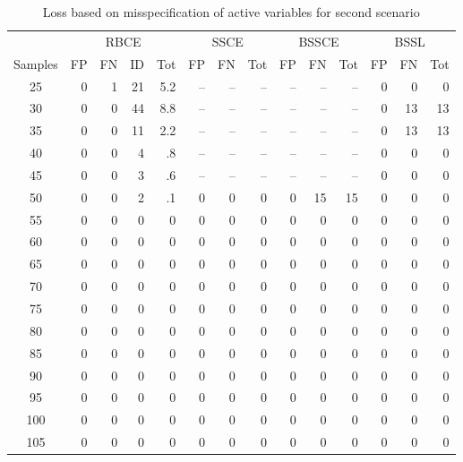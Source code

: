 \documentclass[preprint,12pt]{elsarticle}
\begin{document}
\begin{table}
\small
\caption{Loss based on misspecification of active variables for second scenario}
\label{tab:misspec2}
\begin{tabular}{|c||rrr|r||rr|r||rr|r||rr|r|}
  \hline
  &\multicolumn{4}{c||}{RBCE}&\multicolumn{3}{c||}{SSCE}
  &\multicolumn{3}{c||}{BSSCE}&\multicolumn{3}{c|}{BSSL}\\
  \cline{2-14}
 Samples & FP & FN & ID & Tot & FP & FN & Tot & FP & FN & Tot & FP & FN & Tot \\ 
  \hline
25 &   0 &   1 &  21 & 5.2 & -- &  --  &  -- &  --  &  -- &  --  &   0 &   0 &   0\\ 
  30 &   0 &   0 &  44 & 8.8 & -- &  --  &  -- &  --  &  -- &  --  &  0 &  13 &   13\\ 
  35 &   0 &   0 &  11 & 2.2 & -- &  --  &  -- &  --  &  -- &  --  &  0 &  13 &   13\\ 
  40 &   0 &   0 &   4 & .8 & -- &  --  &  -- &  --  &  -- &  --  &   0 &   0 &   0\\ 
  45 &   0 &   0 &   3 & .6 & -- &  --  &  -- &  --  &  -- &  --  &   0 &   0 &   0\\ 
  50 &   0 &   0 &   2 & .1 &  0 &   0 &   0 &   0 &  15 & 15 &   0 &   0 &   0\\ 
  55 &   0 &   0 &   0 &  0 &   0 &   0 &   0 &   0 &   0 &   0 &   0&   0&   0\\ 
  60 &   0 &   0 &   0 &  0 &   0 &   0 &   0 &   0 &   0 &   0 &   0&   0&   0\\ 
  65 &   0 &   0 &   0 &  0 &   0 &   0 &   0 &   0 &   0 &   0 &   0&   0&   0\\ 
  70 &   0 &   0 &   0 &  0 &   0 &   0 &   0 &   0 &   0 &   0 &   0&   0&   0\\ 
  75 &   0 &   0 &   0 &  0 &   0 &   0 &   0 &   0 &   0 &   0 &   0&   0&   0\\ 
  80 &   0 &   0 &   0 &  0 &   0 &   0 &   0 &   0 &   0 &   0 &   0&   0&   0\\ 
  85 &   0 &   0 &   0 &  0 &   0 &   0 &   0 &   0 &   0 &   0 &   0&   0&   0\\ 
  90 &   0 &   0 &   0 &  0 &   0 &   0 &   0 &   0 &   0 &   0 &   0&   0&   0\\ 
  95 &   0 &   0 &   0 &  0 &   0 &   0 &   0 &   0 &   0 &   0 &   0&   0&   0\\ 
  100 &   0 &   0 &   0 &  0 &   0 &   0 &   0 &   0 &   0 &   0 &   0&   0&   0\\ 
  105 &   0 &   0 &   0 &  0 &   0 &   0 &   0 &   0 &   0 &   0 &   0&   0&   0\\ 

\end{tabular}
\end{table}
\end{document}
